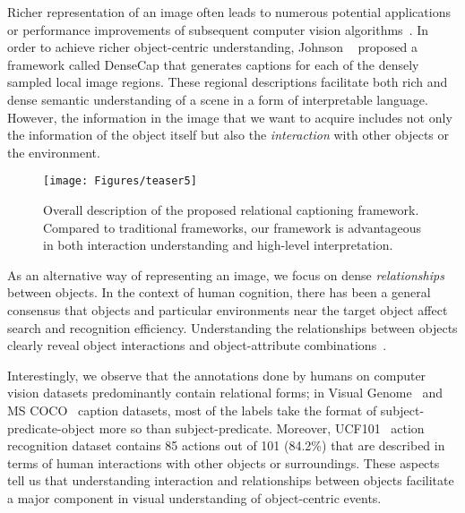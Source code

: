 \documentclass[10pt,twocolumn,letterpaper]{article}
\begin{document}
Richer representation of an image often leads to numerous potential applications or performance improvements of subsequent computer vision algorithms~\cite{mottaghi2014role,oliva2007role}. 
In order to achieve richer object-centric understanding, Johnson \etal~\cite{johnson2016densecap} proposed a framework called DenseCap that generates captions for each of the densely sampled local image regions.
{These regional descriptions facilitate both rich and dense semantic understanding of a scene in a form of interpretable language.}
However, the information in the image that we want to acquire includes not only the information of the object itself but also the \emph{interaction} with other objects or the environment.


\begin{figure}[t]
	\centering
		\texttt{[image: Figures/teaser5]}
	\vspace{-7mm}
	\caption{Overall description of the proposed relational captioning framework. Compared to traditional frameworks, our framework is advantageous in both interaction understanding and high-level interpretation.\vspace{-3mm}}
	\label{fig:teaser}
\end{figure}

As {an alternative way} of representing an image, we focus on dense \emph{relationships} between objects.
In the context of human cognition, there has been a general consensus that objects and particular environments near the target object affect search and recognition efficiency.
Understanding the relationships between objects clearly reveal object interactions and object-attribute combinations~\cite{Johnson_2017_ICCV,kim2018disjoint,lu2016visual}.


Interestingly, we observe that the annotations done by humans on computer vision datasets predominantly contain relational forms;
in Visual Genome~\cite{krishna2017visual} and MS COCO~\cite{lin2014microsoft} caption datasets, 
most of the labels take the format of subject-predicate-object more so than subject-predicate.
Moreover, UCF101~\cite{soomro2012ucf101} action recognition dataset contains 85 actions out of 101 (84.2\%) that are described in terms of human interactions with other objects or surroundings. 
These aspects tell us that understanding interaction and relationships between objects facilitate a major component in visual understanding of object-centric events.
\end{document}
